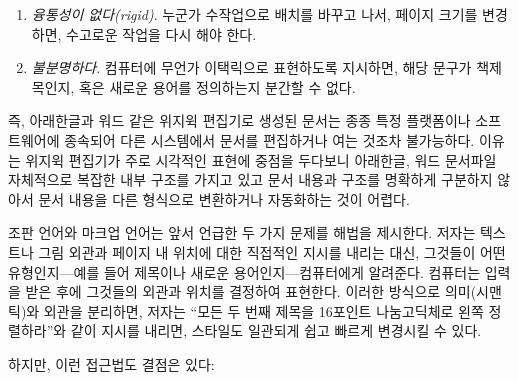 \documentclass[
  letterpaper,
]{book}
\begin{document}
\begin{enumerate}
\def\labelenumi{\arabic{enumi}.}
\item
  \emph{융통성이 없다(rigid)}. 누군가 수작업으로 배치를 바꾸고 나서,
  페이지 크기를 변경하면, 수고로운 작업을 다시 해야 한다.
\item
  \emph{불분명하다}. 컴퓨터에 무언가 이택릭으로 표현하도록 지시하면,
  해당 문구가 책제목인지, 혹은 새로운 용어를 정의하는지 분간할 수 없다.
\end{enumerate}

즉, 아래한글과 워드 같은 위지윅 편집기로 생성된 문서는 종종 특정
플랫폼이나 소프트웨어에 종속되어 다른 시스템에서 문서를 편집하거나 여는
것조차 불가능하다. 이유는 위지윅 편집기가 주로 시각적인 표현에 중점을
두다보니 아래한글, 워드 문서파일 자체적으로 복잡한 내부 구조를 가지고
있고 문서 내용과 구조를 명확하게 구분하지 않아서 문서 내용을 다른
형식으로 변환하거나 자동화하는 것이 어렵다.

조판 언어와 마크업 언어는 앞서 언급한 두 가지 문제를 해법을 제시한다.
저자는 텍스트나 그림 외관과 페이지 내 위치에 대한 직접적인 지시를 내리는
대신, 그것들이 어떤 유형인지---예를 들어 제목이나 새로운
용어인지---컴퓨터에게 알려준다. 컴퓨터는 입력을 받은 후에 그것들의
외관과 위치를 결정하여 표현한다. 이러한 방식으로 의미(시맨틱)와 외관을
분리하면, 저자는 ``모든 두 번째 제목을 16포인트 나눔고딕체로 왼쪽
정렬하라''와 같이 지시를 내리면, 스타일도 일관되게 쉽고 빠르게 변경시킬
수 있다.

하지만, 이런 접근법도 결점은 있다:
\end{document}
